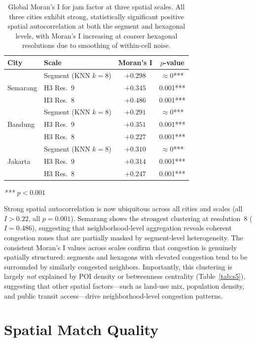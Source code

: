 \documentclass[preprint,12pt]{elsarticle}
\begin{document}
\begin{table}[!htbp]
\centering
\caption{Global Moran's I for jam factor at three spatial scales. All three cities exhibit strong, statistically significant positive spatial autocorrelation at both the segment and hexagonal levels, with Moran's I increasing at coarser hexagonal resolutions due to smoothing of within-cell noise.}
\label{tab:s6}
\begin{tabular}{llcc}
\toprule
City & Scale & Moran's I & $p$-value \\
\midrule
\multirow{3}{*}{Semarang}
 & Segment (KNN $k{=}8$)    & $+0.298$ & $\approx 0$*** \\
 & H3 Res.\ 9 & $+0.345$ & 0.001*** \\
 & H3 Res.\ 8 & $+0.486$ & 0.001*** \\
\midrule
\multirow{3}{*}{Bandung}
 & Segment (KNN $k{=}8$)    & $+0.291$ & $\approx 0$*** \\
 & H3 Res.\ 9 & $+0.351$ & 0.001*** \\
 & H3 Res.\ 8 & $+0.227$ & 0.001*** \\
\midrule
\multirow{3}{*}{Jakarta}
 & Segment (KNN $k{=}8$)    & $+0.310$ & $\approx 0$*** \\
 & H3 Res.\ 9 & $+0.314$ & 0.001*** \\
 & H3 Res.\ 8 & $+0.247$ & 0.001*** \\
\bottomrule
\end{tabular}

\smallskip
\noindent\textit{*** $p < 0.001$}
\end{table}

Strong spatial autocorrelation is now ubiquitous across all cities and scales (all $I > 0.22$, all $p = 0.001$). Semarang shows the strongest clustering at resolution~8 ($I = 0.486$), suggesting that neighborhood-level aggregation reveals coherent congestion zones that are partially masked by segment-level heterogeneity. The consistent Moran's I values across scales confirm that congestion is genuinely spatially structured: segments and hexagons with elevated congestion tend to be surrounded by similarly congested neighbors. Importantly, this clustering is largely \emph{not} explained by POI density or betweenness centrality (Table~\ref{tab:s5}), suggesting that other spatial factors---such as land-use mix, population density, and public transit access---drive neighborhood-level congestion patterns.

\section{Spatial Match Quality}
\label{sec:s5}
\end{document}
